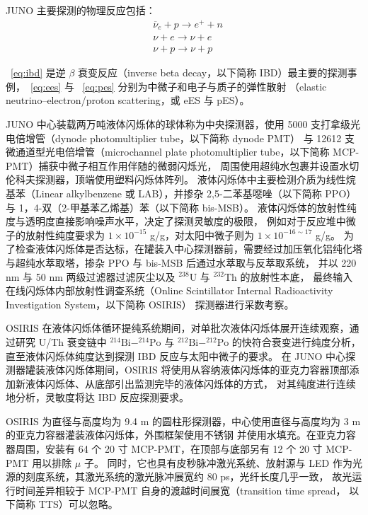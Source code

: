 JUNO 主要探测的物理反应包括：
\begin{align}
    &\overline{\nu}_e+p\rightarrow e^++n \label{eq:ibd}\\
    &\nu+e\rightarrow\nu+e \label{eq:ees}\\
    &\nu+p\rightarrow\nu+p \label{eq:pes}
\end{align}

~\eqref{eq:ibd} 是逆 $\beta$ 衰变反应（inverse beta decay，以下简称 IBD）最主要的探测事例，~\eqref{eq:ees} 与 ~\eqref{eq:pes} 分别为中微子和电子与质子的弹性散射
（elastic neutrino–electron/proton scattering，或 eES 与 pES）。

JUNO 中心装载两万吨液体闪烁体的球体称为中央探测器，使用 5000 支打拿级光电倍增管（dynode photomultiplier tube，以下简称 dynode PMT）
与 12612 支微通道型光电倍增管（microchannel plate photomultiplier tube，以下简称 MCP-PMT）捕获中微子相互作用伴随的微弱闪烁光，
周围使用超纯水包裹并设置水切伦科夫探测器，顶端使用塑料闪烁体阵列。
液体闪烁体中主要检测介质为线性烷基苯（Linear alkylbenzene 或 LAB），并掺杂
2,5-二苯基噁唑（以下简称 PPO）与 1，4-双（2-甲基苯乙烯基）苯（以下简称 bis-MSB）。
液体闪烁体的放射性纯度与透明度直接影响噪声水平，决定了探测灵敏度的极限，
例如对于反应堆中微子的放射性纯度要求为 $1\times10^{-15}$ g/g，对太阳中微子则为 $1\times10^{-16\sim17}$ g/g。
为了检查液体闪烁体是否达标，在罐装入中心探测器前，需要经过加压氧化铝纯化塔与超纯水萃取塔，掺杂 PPO 与 bis-MSB 后通过水萃取与反萃取系统，
并以 220 nm 与 50 nm 两级过滤器过滤灰尘以及 $^{238}\text{U}$ 与 $^{232}\text{Th}$ 的放射性本底，
最终输入在线闪烁体内部放射性调查系统（Online Scintillator Internal Radioactivity Investigation System，以下简称 OSIRIS）
探测器\cite{junocollaborationDesignSensitivityJUNO2021}进行采数考察。

OSIRIS 在液体闪烁体循环提纯系统期间，对单批次液体闪烁体展开连续观察，通过研究 U/Th 衰变链中 $^{214}\text{Bi}-^{214}\text{Po}$ 与 
$^{212}\text{Bi}-^{212}\text{Po}$ 的快符合衰变进行纯度分析，直至液体闪烁体纯度达到探测 IBD 反应与太阳中微子的要求。
在 JUNO 中心探测器罐装液体闪烁体期间，OSIRIS 将使用从容纳液体闪烁体的亚克力容器顶部添加新液体闪烁体、从底部引出监测完毕的液体闪烁体的方式，
对其纯度进行连续地分析，灵敏度将达 IBD 反应探测要求。

OSIRIS 为直径与高度均为 9.4 m 的圆柱形探测器，中心使用直径与高度均为 3 m 的亚克力容器灌装液体闪烁体，外围框架使用不锈钢
并使用水填充。在亚克力容器周围，安装有 64 个 20 寸 MCP-PMT，在顶部与底部另有 12 个 20 寸 MCP-PMT 用以排除 $\mu$ 子。
同时，它也具有皮秒脉冲激光系统、放射源与 LED 作为光源的刻度系统，其激光系统的激光脉冲展宽约 80 ps，光纤长度几乎一致，
故光运行时间差异相较于 MCP-PMT 自身的渡越时间展宽（transition time spread， 以下简称 TTS）可以忽略。

